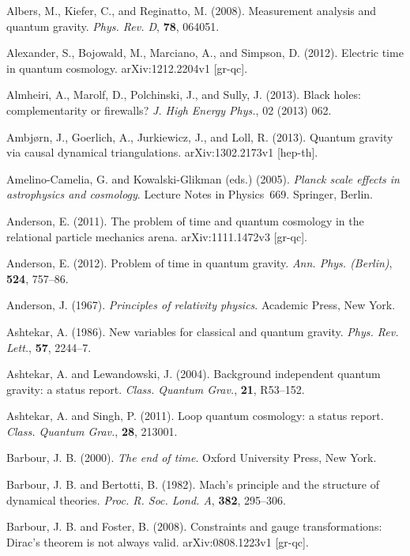 \documentclass[12pt]{article}
\begin{document}
\bibitem{} Albers, M., Kiefer, C., and Reginatto,
           M. (2008). Measurement analysis and quantum gravity. {\em
           Phys. Rev. D}, {\bf 78}, 064051.

\bibitem{} Alexander, S., Bojowald, M., Marciano, A., and Simpson,
  D. (2012). Electric time in quantum cosmology. arXiv:1212.2204v1
  [gr-qc].  

\bibitem{} Almheiri, A., Marolf, D., Polchinski, J., and Sully,
  J. (2013).  	
Black holes: complementarity or firewalls? {\em J. High Energy Phys.},
02 (2013) 062.

\bibitem{} Ambj\o rn, J., Goerlich, A., Jurkiewicz, J., and Loll,
  R. (2013). Quantum gravity via causal dynamical triangulations.
  arXiv:1302.2173v1 [hep-th].

\bibitem{} Amelino-Camelia, G. and Kowalski-Glikman (eds.) (2005).
           {\em Planck scale effects in astrophysics and cosmology}.
           Lecture Notes in Physics~669. Springer, Berlin.

\bibitem{} Anderson, E. (2011). The problem of time and quantum
  cosmology in the relational particle mechanics arena. 
  arXiv:1111.1472v3 [gr-qc].

\bibitem{} Anderson, E. (2012). Problem of time in quantum gravity. 
           {\em Ann. Phys. (Berlin)}, {\bf 524}, 757--86.

\bibitem{} Anderson, J. (1967). {\em Principles of relativity physics}.
           Academic Press, New York.

\bibitem{} Ashtekar, A. (1986). New variables for classical and quantum
           gravity. {\em Phys. Rev. Lett.}, {\bf 57}, 2244--7.

\bibitem{} Ashtekar, A. and Lewandowski, J. (2004).
           Background independent quantum gravity: a status report.
           {\em Class. Quantum Grav.}, {\bf 21}, R53--152.

\bibitem{} Ashtekar, A. and Singh, P. (2011).            	
Loop quantum cosmology: a status report.
{\em Class. Quantum Grav.}, {\bf 28}, 213001.

\bibitem{} Barbour, J. B. (2000). {\em The end of time}.
           Oxford University Press, New York.

\bibitem{} Barbour, J. B. and Bertotti, B. (1982). Mach's principle
           and the structure of dynamical theories.
           {\em Proc. R. Soc. Lond. A}, {\bf 382}, 295--306.  

\bibitem{} Barbour, J. B. and Foster, B. (2008).
           Constraints and gauge transformations: Dirac's theorem is
           not always valid. arXiv:0808.1223v1 [gr-qc].
\end{document}
